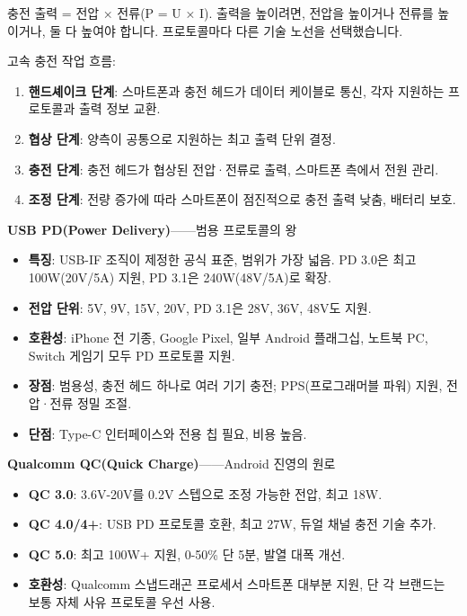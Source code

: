 
충전 출력 = 전압 × 전류(P = U × I). 출력을 높이려면, 전압을 높이거나 전류를 높이거나, 둘 다 높여야 합니다. 프로토콜마다 다른 기술 노선을 선택했습니다.

고속 충전 작업 흐름:

\begin{enumerate}
  \item \textbf{핸드셰이크 단계}: 스마트폰과 충전 헤드가 데이터 케이블로 통신, 각자 지원하는 프로토콜과 출력 정보 교환.
  \item \textbf{협상 단계}: 양측이 공통으로 지원하는 최고 출력 단위 결정.
  \item \textbf{충전 단계}: 충전 헤드가 협상된 전압·전류로 출력, 스마트폰 측에서 전원 관리.
  \item \textbf{조정 단계}: 전량 증가에 따라 스마트폰이 점진적으로 충전 출력 낮춤, 배터리 보호.
\end{enumerate}


\textbf{USB PD(Power Delivery)}——범용 프로토콜의 왕

\begin{itemize}
  \item \textbf{특징}: USB-IF 조직이 제정한 공식 표준, 범위가 가장 넓음. PD 3.0은 최고 100W(20V/5A) 지원, PD 3.1은 240W(48V/5A)로 확장.
  \item \textbf{전압 단위}: 5V, 9V, 15V, 20V, PD 3.1은 28V, 36V, 48V도 지원.
  \item \textbf{호환성}: iPhone 전 기종, Google Pixel, 일부 Android 플래그십, 노트북 PC, Switch 게임기 모두 PD 프로토콜 지원.
  \item \textbf{장점}: 범용성, 충전 헤드 하나로 여러 기기 충전; PPS(프로그래머블 파워) 지원, 전압·전류 정밀 조절.
  \item \textbf{단점}: Type-C 인터페이스와 전용 칩 필요, 비용 높음.
\end{itemize}

\textbf{Qualcomm QC(Quick Charge)}——Android 진영의 원로

\begin{itemize}
  \item \textbf{QC 3.0}: 3.6V-20V를 0.2V 스텝으로 조정 가능한 전압, 최고 18W.
  \item \textbf{QC 4.0/4+}: USB PD 프로토콜 호환, 최고 27W, 듀얼 채널 충전 기술 추가.
  \item \textbf{QC 5.0}: 최고 100W+ 지원, 0-50\% 단 5분, 발열 대폭 개선.
  \item \textbf{호환성}: Qualcomm 스냅드래곤 프로세서 스마트폰 대부분 지원, 단 각 브랜드는 보통 자체 사유 프로토콜 우선 사용.
\end{itemize}

